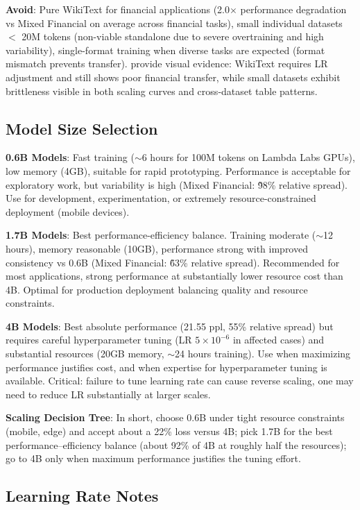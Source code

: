 \textbf{Avoid}: Pure WikiText for financial applications (2.0$\times$ performance degradation vs Mixed Financial on average across financial tasks), small individual datasets $<$ 20M tokens (non-viable standalone due to severe overtraining and high variability), single-format training when diverse tasks are expected (format mismatch prevents transfer).  provide visual evidence: WikiText requires LR adjustment and still shows poor financial transfer, while small datasets exhibit brittleness visible in both scaling curves and cross‑dataset table patterns.

\subsection{Model Size Selection}

\textbf{0.6B Models}: Fast training ($\sim$6 hours for 100M tokens on Lambda Labs GPUs), low memory (4GB), suitable for rapid prototyping. Performance is acceptable for exploratory work, but variability is high (Mixed Financial: \~98\% relative spread). Use for development, experimentation, or extremely resource-constrained deployment (mobile devices).

\textbf{1.7B Models}: Best performance-efficiency balance. Training moderate ($\sim$12 hours), memory reasonable (10GB), performance strong with improved consistency vs 0.6B (Mixed Financial: \~63\% relative spread). Recommended for most applications, strong performance at substantially lower resource cost than 4B. Optimal for production deployment balancing quality and resource constraints.

\textbf{4B Models}: Best absolute performance (21.55 ppl, 55\% relative spread) but requires careful hyperparameter tuning (LR $5 \times 10^{-6}$ in affected cases) and substantial resources (20GB memory, $\sim$24 hours training). Use when maximizing performance justifies cost, and when expertise for hyperparameter tuning is available. Critical: failure to tune learning rate can cause reverse scaling, one may need to reduce LR substantially at larger scales.

\textbf{Scaling Decision Tree}: In short, choose 0.6B under tight resource constraints (mobile, edge) and accept about a 22\% loss versus 4B; pick 1.7B for the best performance–efficiency balance (about 92\% of 4B at roughly half the resources); go to 4B only when maximum performance justifies the tuning effort.

\subsection{Learning Rate Notes}

